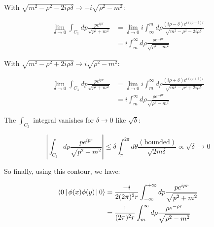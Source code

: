\documentclass{beamer}
\newcommand{\integrand}{\frac{p e^{ipr}}{\sqrt{p^2 + m^2}}}
\newcommand{\phixy}{\Braket{0|\phi(x)\phi(y)|0}}
\newcommand{\intii}{\int_{-\infty}^{+\infty}}
\newcommand{\limdel}{\lim_{\delta \to 0}}
\newcommand{\integral}{\intii dp \integrand}
\begin{document}
\begin{frame}

With $\sqrt{m^2 - \rho^2 - 2i\rho\delta} \to -i \sqrt{\rho^2 - m^2}$:

\begin{equation*}
\begin{split}
\limdel \int_{C_1} dp \integrand &= \limdel i \int_\infty^m d\rho \frac{(i\rho - \delta)e^{i(i\rho - \delta)r}}{\sqrt{m^2 - \rho^2 - 2i\rho\delta}} \\
&= i \int_m^\infty d\rho \frac{\rho e^{-\rho r}}{\sqrt{\rho^2 - m^2}}
\end{split}
\end{equation*}

With $\sqrt{m^2 - \rho^2 + 2i\rho\delta} \to i \sqrt{\rho^2 - m^2}$:

\begin{equation*}
\begin{split}
\limdel \int_{C_3} dp \integrand &= \limdel i \int_m^\infty d\rho \frac{(i\rho + \delta)e^{i(i\rho + \delta)r}}{\sqrt{m^2 - \rho^2 + 2i\rho\delta}} \\
&= i \int_m^\infty d\rho \frac{\rho e^{-\rho r}}{\sqrt{\rho^2 - m^2}}
\end{split}
\end{equation*}
\end{frame}


\begin{frame}
The $\int_{C_2}$ integral vanishes for $\delta \to 0$ like $\sqrt{\delta}$:

\begin{equation*}
\left| \int_{C_2} dp \integrand \right| \leq \delta \int_\pi^{2\pi} d\theta
\frac{(\mathrm{bounded})}{\sqrt{2m\delta}} \propto \sqrt{\delta} \to 0
\end{equation*}

So finally, using this contour, we have:

\begin{equation*}
\begin{split}
\phixy &= \frac{-i}{2(2\pi)^2r} \integral \\
       &= \frac{1}{(2\pi)^2 r} \int_m^\infty d\rho \frac{\rho e^{-\rho r}}{\sqrt{\rho^2 - m^2}}
\end{split}
\end{equation*}

\end{frame}
\end{document}
